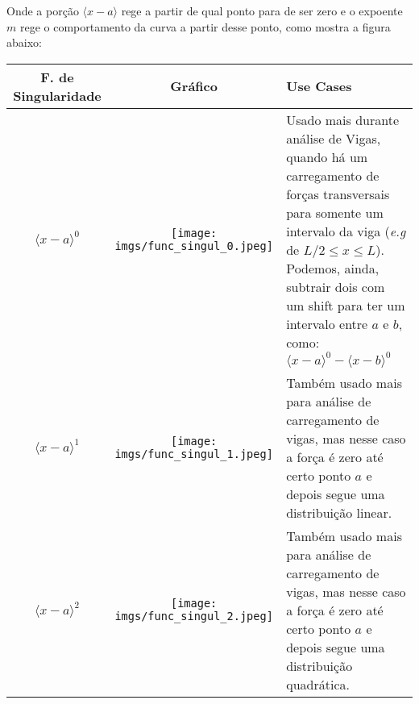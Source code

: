 \documentclass{article}
\begin{document}
                Onde a porção $\langle x - a \rangle$ rege a partir de qual ponto para de ser zero e o expoente $m$ rege o comportamento da curva a partir desse ponto, como mostra a figura abaixo:

                \begin{table}[h]
                    \centering
                    \begin{tabular}{|c|c|l|} \hline
                        \textbf{F. de Singularidade} & \textbf{Gráfico} & \textbf{Use Cases} \\ \hline
                        $\langle x - a\rangle^0$ & 
                            \begin{minipage}{.3\textwidth}
                                \centering
                                \texttt{[image: imgs/func\_singul\_0.jpeg]}
                            \end{minipage}&
                            \begin{minipage}{.4\textwidth}
                                Usado mais durante análise de Vigas, quando há um carregamento de forças transversais para somente um intervalo da viga (\emph{e.g} de $L/2 \le x \le L$). Podemos,
                                ainda, subtrair dois com um shift para ter um intervalo entre $a$ e $b$, como: $\langle x - a\rangle^0 - \langle x - b\rangle^0$ 
                            \end{minipage}  \\ \hline

                        $\langle x - a\rangle^1$ & 
                            \begin{minipage}{.3\textwidth}
                                \centering
                                \texttt{[image: imgs/func\_singul\_1.jpeg]}
                            \end{minipage}&
                            \begin{minipage}{.4\textwidth}
                                Também usado mais para análise de carregamento de vigas, mas nesse caso a força é zero até certo ponto $a$ e depois segue uma distribuição linear.
                            \end{minipage}  \\ \hline

                        $\langle x - a\rangle^2$ & 
                            \begin{minipage}{.3\textwidth}
                                \centering
                                \texttt{[image: imgs/func\_singul\_2.jpeg]}
                            \end{minipage}&
                            \begin{minipage}{.4\textwidth}
                                Também usado mais para análise de carregamento de vigas, mas nesse caso a força é zero até certo ponto $a$ e depois segue uma distribuição quadrática.
                            \end{minipage}  \\ \hline
                        

\end{tabular}
\end{table}
\end{document}
